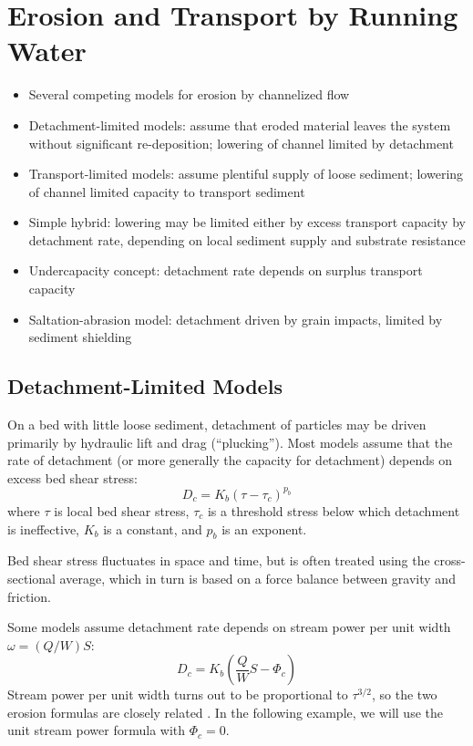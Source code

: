 \documentclass[12pt]{amsart}
\begin{document}
\section{Erosion and Transport by Running Water}

\begin{itemize}
\item Several competing models for erosion by channelized flow
\item Detachment-limited models: assume that eroded material leaves the system without significant re-deposition; lowering of channel limited by detachment
\item Transport-limited models: assume plentiful supply of loose sediment; lowering of channel limited capacity to transport sediment
\item Simple hybrid: lowering may be limited either by excess transport capacity by detachment rate, depending on local sediment supply and substrate resistance
\item Undercapacity concept: detachment rate depends on surplus transport capacity
\item Saltation-abrasion model: detachment driven by grain impacts, limited by sediment shielding
\end{itemize}

\subsection{Detachment-Limited Models}

On a bed with little loose sediment, detachment of particles may be driven primarily by hydraulic lift and drag (``plucking''). Most models assume that the rate of detachment (or more generally the capacity for detachment) depends on excess bed shear stress:
\begin{equation}
D_c = K_b \left( \tau - \tau_c \right)^{p_b}
\end{equation}
where $\tau$ is local bed shear stress, $\tau_c$ is a threshold stress below which detachment is ineffective, $K_b$ is a constant, and $p_b$ is an exponent.

Bed shear stress fluctuates in space and time, but is often treated using the cross-sectional average, which in turn is based on a force balance between gravity and friction.

Some models assume detachment rate depends on stream power per unit width $\omega = (Q/W) S$:
\begin{equation}
D_c = K_b \left( \frac{Q}{W}S - \Phi_c \right)
\end{equation}
Stream power per unit width turns out to be proportional to $\tau^{3/2}$, so the two erosion formulas are closely related \citep{whipple1999dynamics}. In the following example, we will use the unit stream power formula with $\Phi_c=0$.
\end{document}
